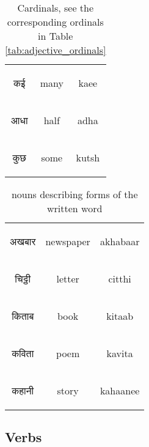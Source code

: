 \begin{table}[H]
\begin{tabular}{c|c|c}
    \begin{hindi} कई  \end{hindi} & many & kaee \\
    \begin{hindi} आधा  \end{hindi} & half & adha \\
    \begin{hindi} कुछ  \end{hindi} & some & kutsh \\
    \end{tabular}
    \caption{Cardinals, see the corresponding ordinals in Table \ref{tab:adjective_ordinals}}
    \label{tab:nouns_cardinals}
\end{table}

\begin{table}[H]
    \centering
    \begin{tabular}{c|c|c}        
    \begin{hindi} अखबार\end{hindi} & newspaper 	& akhabaar \\
    \begin{hindi}चिट्ठी  \end{hindi} & letter 	&  citthi\\
    \begin{hindi}किताब   \end{hindi} & book 	&  kitaab\\
    \begin{hindi}कविता   \end{hindi} & poem 	&  kavita\\
    \begin{hindi}कहानी   \end{hindi} & story	&  kahaanee \\
    \end{tabular}
	\caption{nouns describing forms of the written word}
    \label{tab:nouns_literature}
\end{table}

\newpage 
\subsection{Verbs}



